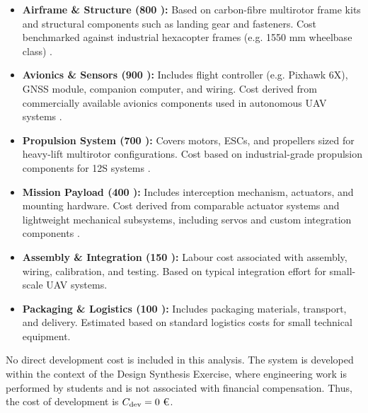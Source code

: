 \begin{itemize}[noitemsep, topsep=2pt]

\item \textbf{Airframe \& Structure (800 \texteuro{}):}  
Based on carbon-fibre multirotor frame kits and structural components such as landing gear and fasteners. Cost benchmarked against industrial hexacopter frames (e.g. 1550 mm wheelbase class) \cite{DroneAssemble2024IndustrialPricing}.

\item \textbf{Avionics \& Sensors (900 \texteuro{}):}  
Includes flight controller (e.g. Pixhawk 6X), GNSS module, companion computer, and wiring. Cost derived from commercially available avionics components used in autonomous UAV systems \cite{MotioNew2024PixhawkComparison}.

\item \textbf{Propulsion System (700 \texteuro{}):}  
Covers motors, ESCs, and propellers sized for heavy-lift multirotor configurations. Cost based on industrial-grade propulsion components for 12S systems \cite{DroneAssemble2024IndustrialPricing}.

\item \textbf{Mission Payload (400 \texteuro{}):}  
Includes interception mechanism, actuators, and mounting hardware. Cost derived from comparable actuator systems and lightweight mechanical subsystems, including servos and custom integration components \cite{DSLRProsDSLRpros}.

\item \textbf{Assembly \& Integration (150 \texteuro{}):}  
Labour cost associated with assembly, wiring, calibration, and testing. Based on typical integration effort for small-scale UAV systems.

\item \textbf{Packaging \& Logistics (100 \texteuro{}):}  
Includes packaging materials, transport, and delivery. Estimated based on standard logistics costs for small technical equipment.

\end{itemize}
\vspace{-5pt}
No direct development cost is included in this analysis. The system is developed within the context of the Design Synthesis Exercise, where engineering work is performed by students and is not associated with financial compensation. Thus, the cost of development is $C_{\text{dev}} = \text{0 \texteuro{}}$.
\vspace{-15pt}

